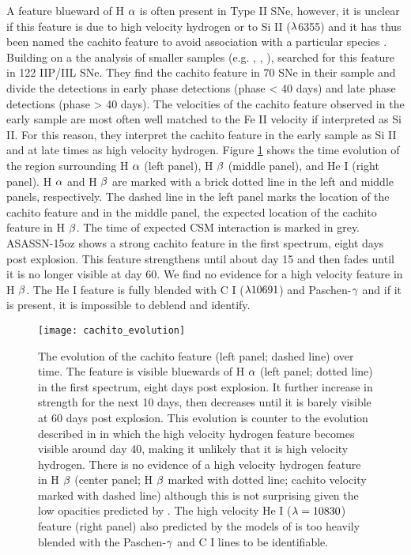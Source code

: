 \documentclass[a4paper,fleqn,usenatbib]{mnras}
\begin{document}
A feature blueward of H $\rm{\alpha}$ is often present in Type II SNe, however, it is unclear if this feature is due to high velocity hydrogen or to Si II ($\rm{\lambda}$6355)
and it has thus been named the cachito feature to avoid association with a particular species \citep{2017gutierrez}.
Building on a the analysis of smaller samples (e.g. \citealt{2001leonard}, \citet{2013inserra}, \citealt{2014valenti}), \citet{2017gutierrez} searched for this feature in 122 IIP/IIL SNe. 
They find the cachito feature in 70 SNe in their sample and divide the detections in early phase detections (phase < 40 days) and late phase detections (phase > 40 days).
The velocities of the cachito feature observed in the early sample are most often well matched to the Fe II velocity if interpreted as Si II. 
For this reason, they interpret the cachito feature in the early sample as Si II and at late times as high velocity hydrogen.
Figure \ref{fig:CachitoEvolve} shows the time evolution of the region surrounding H $\rm{\alpha}$ (left panel), H $\rm{\beta}$ (middle panel), and He I (right panel).
H $\rm{\alpha}$ and H $\rm{\beta}$ are marked with a brick dotted line in the left and middle panels, respectively.
The dashed line in the left panel marks the location of the cachito feature and in the middle panel, the expected location of the cachito feature in H $\rm{\beta}$.
The time of expected CSM interaction is marked in grey.
ASASSN-15oz shows a strong cachito feature in the first spectrum, eight days post explosion. 
This feature strengthens until about day 15 and then fades until it is no longer visible at day 60. 
We find no evidence for a high velocity feature in H $\rm{\beta}$.
The He I feature is fully blended with C I ($\rm{\lambda 10691}$) and Paschen-$\rm{\gamma}$ and if it is present, it is impossible to deblend and identify.
\begin{figure}
\begin{center}
\texttt{[image: cachito\_evolution]}
\caption{The evolution of the cachito feature (left panel; dashed line) over time. 
The feature is visible bluewards of H $\rm{\alpha}$ (left panel; dotted line)  in the first spectrum, eight days post explosion.
It further increase in strength for the next 10 days, then decreases until it is barely visible at 60 days post explosion.
This evolution is counter to the evolution described in \citet{2007chugai} in which the high velocity hydrogen feature becomes visible around day 40, making it unlikely that it is high velocity hydrogen.
There is no evidence of a high velocity hydrogen feature in H $\rm{\beta}$ (center panel; H $\rm{\beta}$ marked with dotted line; cachito velocity marked with dashed line) although this is not surprising given the low opacities predicted by \citet{2007chugai}.
The high velocity He I ($\rm{\lambda=10830}$) feature (right panel) also predicted by the models of \citet{2007chugai} is too heavily blended with the Paschen-$\rm{\gamma}$ and C I lines to be identifiable.}
\label{fig:CachitoEvolve}
\end{center}
\end{figure}
\end{document}
